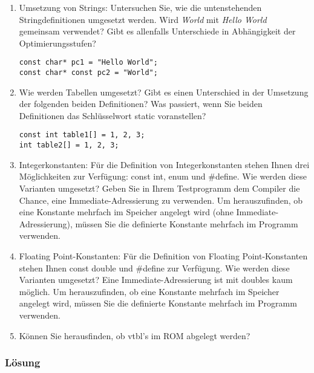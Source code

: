 \begin{enumerate}
  \item  Umsetzung von Strings: Untersuchen Sie, wie die untenstehenden Stringdefinitionen umgesetzt werden. Wird \textit{World} mit \textit{Hello World} gemeinsam verwendet? Gibt es allenfalls Unterschiede in Abhängigkeit der Optimierungsstufen?

\texttt{const char* pc1 = "Hello World";\\
const char* const pc2 = "World";}

  \item Wie werden Tabellen umgesetzt? Gibt es einen Unterschied in der Umsetzung der folgenden beiden Definitionen? Was passiert, wenn Sie beiden Definitionen das Schlüsselwort static voranstellen?

\texttt{const int table1[] = {1, 2, 3};\\
int table2[] = {1, 2, 3};}

  \item Integerkonstanten: Für die Definition von Integerkonstanten stehen Ihnen drei Möglichkeiten zur Verfügung: const int, enum und \#define. Wie werden diese Varianten umgesetzt? Geben Sie in Ihrem Testprogramm dem Compiler die Chance, eine Immediate-Adressierung zu verwenden. Um herauszufinden, ob eine Konstante mehrfach im Speicher angelegt wird (ohne Immediate-Adressierung), müssen Sie die definierte Konstante mehrfach im Programm verwenden.

  \item Floating Point-Konstanten: Für die Definition von Floating Point-Konstanten stehen Ihnen const double und \#define zur Verfügung. Wie werden diese Varianten umgesetzt? Eine Immediate-Adressierung ist mit doubles kaum möglich. Um herauszufinden, ob eine Konstante mehrfach im Speicher angelegt wird, müssen Sie die definierte Konstante mehrfach im Programm verwenden.

  \item Können Sie herausfinden, ob vtbl's im ROM abgelegt werden?
\end{enumerate}

\subsubsection{Lösung}

